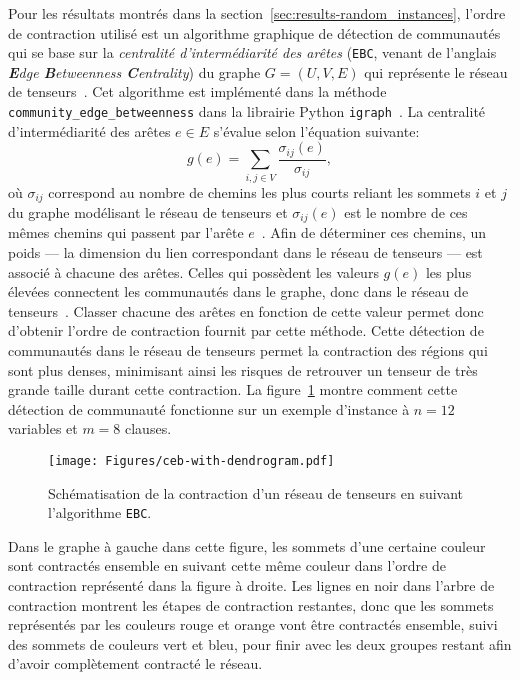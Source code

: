 Pour les résultats montrés dans la section~\ref{sec:results-random_instances}, l'ordre de contraction utilisé est un algorithme graphique de détection de communautés qui se base sur la \emph{centralité d'intermédiarité des arêtes} (\verb|EBC|, venant de l'anglais \textit{\textbf{E}dge \textbf{B}etweenness \textbf{C}entrality}) du graphe $G = (U, V, E)$ qui représente le réseau de tenseurs~\cite{girvan_community_2002}.
Cet algorithme est implémenté dans la méthode \verb|community_edge_betweenness| dans la librairie Python \verb|igraph|~\cite{csardi_igraph_nodate}.
La centralité d'intermédiarité des arêtes $e \in E$ s'évalue selon l'équation suivante:
\begin{equation}\label{eq:edge-betweenness-centrality}
    g(e) = \sum_{i, j \in V} \frac{\sigma_{ij}(e)}{\sigma_{ij}},
\end{equation}
où $\sigma_{ij}$ correspond au nombre de chemins les plus courts reliant les sommets $i$ et $j$ du graphe modélisant le réseau de tenseurs et $\sigma_{ij}(e)$ est le nombre de ces mêmes chemins qui passent par l'arête $e$~\cite{gray_hyper-optimized_2021,girvan_community_2002}.
Afin de déterminer ces chemins, un poids --- la dimension du lien correspondant dans le réseau de tenseurs --- est associé à chacune des arêtes.
Celles qui possèdent les valeurs $g(e)$ les plus élevées connectent les communautés dans le graphe, donc dans le réseau de tenseurs~\cite{girvan_community_2002}.
Classer chacune des arêtes en fonction de cette valeur permet donc d'obtenir l'ordre de contraction fournit par cette méthode.
Cette détection de communautés dans le réseau de tenseurs permet la contraction des régions qui sont plus denses, minimisant ainsi les risques de retrouver un tenseur de très grande taille durant cette contraction.
La figure~\ref{fig:ebc-with-dendrogram} montre  comment cette détection de communauté fonctionne sur un exemple d'instance à $n = 12$ variables et $m = 8$ clauses.
\begin{figure}[h]
    \centering
    \texttt{[image: Figures/ceb-with-dendrogram.pdf]}
    \caption[Schématisation de la contraction d'un réseau de tenseurs (\texttt{EBC}).]{Schématisation de la contraction d'un réseau de tenseurs en suivant l'algorithme \texttt{EBC}.}
    \label{fig:ebc-with-dendrogram}
\end{figure}
Dans le graphe à gauche dans cette figure, les sommets d'une certaine couleur sont contractés ensemble en suivant cette même couleur dans l'ordre de contraction représenté dans la figure à droite.
Les lignes en noir dans l'arbre de contraction montrent les étapes de contraction restantes, donc que les sommets représentés par les couleurs rouge et orange vont être contractés ensemble, suivi des sommets de couleurs vert et bleu, pour finir avec les deux groupes restant afin d'avoir complètement contracté le réseau.
